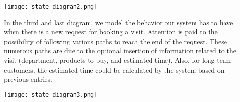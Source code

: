 \medskip
\texttt{[image: state\_diagram2.png]}

\medskip
In the third and last diagram, we model the behavior our system has to have when there is a new request for booking a visit. Attention is paid to the possibility of following various paths to reach the end of the request. These numerous paths are due to the optional insertion of information related to the visit (department, products to buy, and estimated time). Also, for long-term customers, the estimated time could be calculated by the system based on previous entries.

\texttt{[image: state\_diagram3.png]}